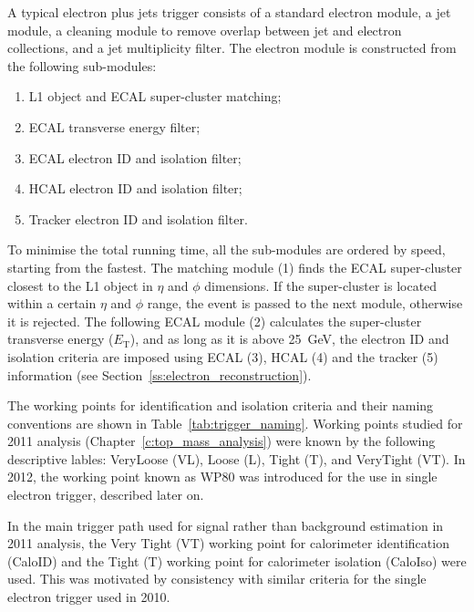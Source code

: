 A typical electron plus jets trigger consists of a standard electron module, a jet module, a cleaning module to remove
overlap between jet and electron collections, and a jet multiplicity filter. The electron module is constructed from the
following sub-modules:

\begin{enumerate}
  \item L1 object and ECAL super-cluster matching;
  \item ECAL transverse energy filter;
  \item ECAL electron ID and isolation filter;
  \item HCAL electron ID and isolation filter;
  \item Tracker electron ID and isolation filter.
\end{enumerate}

To minimise the total running time, all the sub-modules are ordered by speed, starting from the fastest. The matching
module (1) finds the ECAL super-cluster closest to the L1 object in $\eta$ and $\phi$ dimensions. If the super-cluster is
located within a certain $\eta$ and $\phi$ range, the event is passed to the next module, otherwise it is rejected. The
following ECAL module (2) calculates the super-cluster transverse energy ($E_\mathrm{T}$), and as long as it is above
\SI{25}{\GeV}, the electron ID and isolation criteria are imposed using ECAL (3), HCAL (4) and the tracker (5)
information (see Section~\ref{ss:electron_reconstruction}).

The working points for identification and isolation criteria and their naming conventions are shown in
Table~\ref{tab:trigger_naming}. Working points studied for 2011 analysis (Chapter~\ref{c:top_mass_analysis}) were known
by the following descriptive lables: VeryLoose (VL), Loose (L), Tight (T), and VeryTight (VT). In 2012, the working
point known as WP80 was introduced for the use in single electron trigger, described later on.



In the main trigger path used for signal rather than background estimation in 2011 analysis, the Very Tight (VT) working
point for calorimeter identification (CaloID) and the Tight (T) working point for calorimeter isolation (CaloIso) were
used. This was motivated by consistency with similar criteria for the single electron trigger used in 2010.

